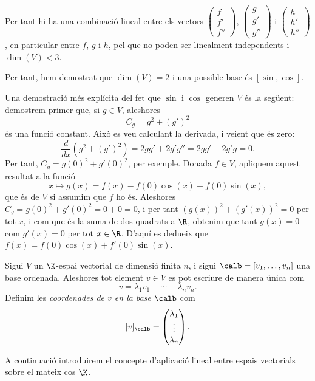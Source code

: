 \begin{exemple}
Per tant hi ha una combinació lineal entre els vectors $\left(\begin{smallmatrix}f\\f'\\f''\end{smallmatrix}\right)$, $\left(\begin{smallmatrix}g\\g'\\g''\end{smallmatrix}\right)$ i $\left(\begin{smallmatrix}h\\h'\\h''\end{smallmatrix}\right)$, en particular entre $f$, $g$ i $h$, pel que no poden ser linealment independents i $\dim(V)<3$.

Per tant, hem demostrat que $\dim(V)=2$ i una possible base és $[\sin,\cos]$.

Una demostració més explícita del fet que $\sin$ i $\cos$ generen $V$ és la següent: demostrem primer que, si $g\in V$, aleshores
\[
C_g = g^2 + (g')^2
\]
és una funció constant. Això es veu calculant la derivada, i veient que és zero:
\[
\frac{d}{dx} (g^2+(g')^2) = 2gg' + 2g'g'' = 2gg'-2g'g = 0.
\]
Per tant, $C_g = g(0)^2 + g'(0)^2$, per exemple. Donada $f\in V$, apliquem aquest resultat a la funció
\[
x\mapsto g(x) = f(x)-f(0)\cos(x) - f(0)\sin(x),
\]
que és de $V$ si assumim que $f$ ho és. Aleshores $C_g = g(0)^2 + g'(0)^2 = 0 + 0 = 0$, i per tant $(g(x))^2+(g'(x))^2=0$ per tot $x$, i com que és la suma de dos quadrats a $\R$, obtenim que tant $g(x)=0$ com $g'(x)=0$ per tot $x\in\R$. D'aquí es dedueix que $f(x) = f(0)\cos(x) + f'(0)\sin(x)$.
\end{exemple}

\begin{definicio}
Sigui $V$ un $\K$-espai vectorial de dimensió finita $n$, i sigui $\calb = [v_1,\ldots ,v_n]$ una base ordenada. Aleshores tot element $v\in V$ es pot escriure de manera única com
\[
v= \lambda_1v_1+\cdots +\lambda_n v_n.
\]
Definim les \emph{coordenades de $v$ en la base $\calb$} com
\[
[v]_{\calb} = \begin{pmatrix}\lambda_1\\\vdots\\\lambda_n\end{pmatrix}.
\]
\end{definicio}

A continuació introduirem el concepte d'aplicació lineal entre espais vectorials sobre el mateix cos $\K$.

